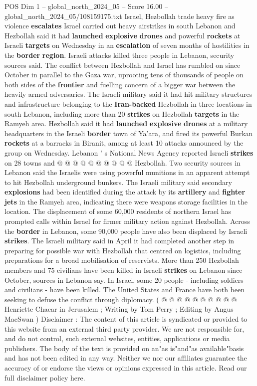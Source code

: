 \begin{textsample}{POS Dim 1 – global\_north\_2024\_05 – Score 16.00 – global\_north\_2024\_05/108159175.txt}  \label{ex:f1_pos_405}
Israel, Hezbollah trade heavy fire as violence \textbf{escalates} Israel carried out heavy airstrikes in south Lebanon and Hezbollah said it had \textbf{launched} \textbf{explosive} \textbf{drones} and powerful \textbf{rockets} at Israeli \textbf{targets} on Wednesday in an \textbf{escalation} of seven months of hostilities in the \textbf{border} \textbf{region}.
Israeli attacks killed three people in Lebanon, security sources said.
The conflict between Hezbollah and Israel has rumbled on since October in parallel to the Gaza war, uprooting tens of thousands of people on both sides of the \textbf{frontier} and fuelling concern of a bigger war between the heavily armed adversaries.
The Israeli military said it had hit military structures and infrastructure belonging to the \textbf{Iran-backed} Hezbollah in three locations in south Lebanon, including more than 20 \textbf{strikes} on Hezbollah \textbf{targets} in the Ramyeh area.
Hezbollah said it had \textbf{launched} \textbf{explosive} \textbf{drones} at a military headquarters in the Israeli \textbf{border} town of Ya'ara, and fired its powerful Burkan \textbf{rockets} at a barracks in Biranit, among at least 10 attacks announced by the group on Wednesday.
Lebanon ' s National News Agency reported Israeli \textbf{strikes} on 28 towns and @ @ @ @ @ @ @ @ @ @ Hezbollah.
Two security sources in Lebanon said the Israelis were using powerful munitions in an apparent attempt to hit Hezbollah underground bunkers.
The Israeli military said secondary \textbf{explosions} had been identified during the attack by its \textbf{artillery} and \textbf{fighter} \textbf{jets} in the Ramyeh area, indicating there were weapons storage facilities in the location.
The displacement of some 60,000 residents of northern Israel has prompted calls within Israel for firmer military action against Hezbollah.
Across the \textbf{border} in Lebanon, some 90,000 people have also been displaced by Israeli \textbf{strikes}.
The Israeli military said in April it had completed another step in preparing for possible war with Hezbollah that centred on logistics, including preparations for a broad mobilisation of reservists.
More than 250 Hezbollah members and 75 civilians have been killed in Israeli \textbf{strikes} on Lebanon since October, sources in Lebanon say.
In Israel, some 20 people - including soldiers and civilians - have been killed.
The United States and France have both been seeking to defuse the conflict through diplomacy. ( @ @ @ @ @ @ @ @ @ @ Henriette Chacar in Jerusalem ; Writing by Tom Perry ; Editing by Angus MacSwan ) Disclaimer : The content of this article is syndicated or provided to this website from an external third party provider.
We are not responsible for, and do not control, such external websites, entities, applications or media publishers.
The body of the text is provided on an"as is"and"as available"basis and has not been edited in any way.
Neither we nor our affiliates guarantee the accuracy of or endorse the views or opinions expressed in this article.
Read our full disclaimer policy here.


\end{textsample}
